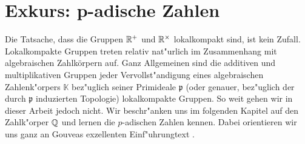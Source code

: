\section{Exkurs: p-adische Zahlen}\label{sec:padisch}
	Die Tatsache, dass die Gruppen $\mathbb{R}^+$ und $\mathbb{R}^\times$ lokalkompakt sind, ist kein Zufall.
	Lokalkompakte Gruppen treten relativ nat"urlich im Zusammenhang mit algebraischen Zahlkörpern auf.
	Ganz Allgemeinen sind die additiven und multiplikativen Gruppen jeder Vervollst"andigung eines algebraischen Zahlenk"orpers $\mathbb{K}$ bez"uglich seiner Primideale $\mathfrak{p}$ (oder genauer, bez"uglich der durch $\mathfrak{p}$ induzierten Topologie) lokalkompakte Gruppen.
	So weit gehen wir in dieser Arbeit jedoch nicht. 
	Wir beschr"anken uns im folgenden Kapitel auf den Zahlk"orper $\mathbb{Q}$ und lernen die $p$-adischen Zahlen kennen.
	Dabei orientieren wir uns ganz an Gouveas exzellenten Einf"uhrungtext \cite{gouv}.
